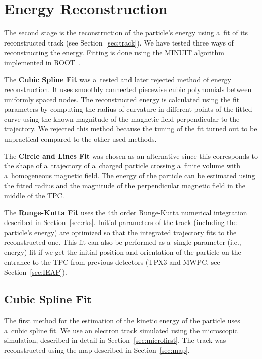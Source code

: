 \chapter{Energy Reconstruction}
\label{sec:energy}
	The second stage is the reconstruction of the particle's energy using a~fit of its reconstructed track (see Section~\ref{sec:track}). We have tested three ways of reconstructing the energy. Fitting is done using the MINUIT algorithm implemented in ROOT~\cite{ROOT}.
	
	The \textbf{Cubic Spline Fit} was a~tested and later rejected method of energy reconstruction. It uses smoothly connected piecewise cubic polynomials between uniformly spaced nodes. The reconstructed energy is calculated using the fit parameters by computing the radius of curvature in different points of the fitted curve using the known magnitude of the magnetic field perpendicular to the trajectory. We rejected this method because the tuning of the fit turned out to be unpractical compared to the other used methods.
	
	The \textbf{Circle and Lines Fit} was chosen as an alternative since this corresponds to the shape of a~trajectory of a~charged particle crossing a~finite volume with a~homogeneous magnetic field. The energy of the particle can be estimated using the fitted radius and the magnitude of the perpendicular magnetic field in the middle of the \ac{TPC}.
	
	The \textbf{Runge-Kutta Fit} uses the 4th order Runge-Kutta numerical integration described in Section~\ref{sec:rks}. Initial parameters of the track (including the particle's energy) are optimized so that the integrated trajectory fits to the reconstructed one. This fit can also be performed as a~single parameter (i.e., energy) fit if we get the initial position and orientation of the particle on the entrance to the \ac{TPC} from previous detectors (\ac{TPX3} and \ac{MWPC}, see Section~\ref{sec:IEAP}).
	
	\section{Cubic Spline Fit}
	\label{sec:cspline}
		The first method for the estimation of the kinetic energy of the particle uses a~cubic spline fit. We use an electron track simulated using the microscopic simulation, described in detail in Section~\ref{sec:microfirst}. The track was reconstructed using the map described in Section~\ref{sec:map}.
				
